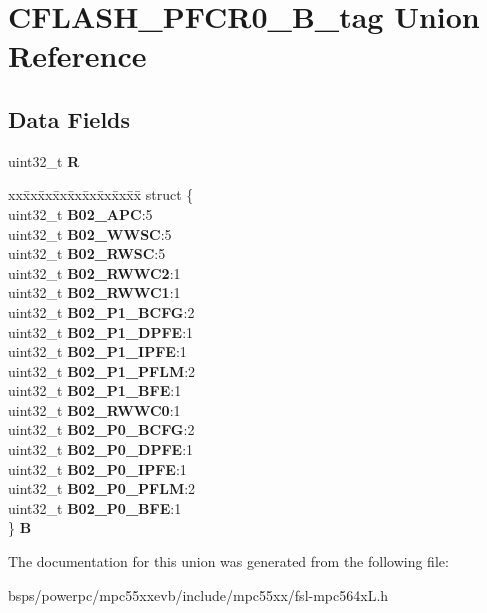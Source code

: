 \hypertarget{unionCFLASH__PFCR0__32B__tag}{}\section{C\+F\+L\+A\+S\+H\+\_\+\+P\+F\+C\+R0\+\_\+B\+\_\+tag Union Reference}
\label{unionCFLASH__PFCR0__32B__tag}
\subsection*{Data Fields}
\begin{DoxyCompactItemize}
\item 
\mbox{\label{unionCFLASH__PFCR0__32B__tag_a981f179d40aac5fec481add4c997f063}} 
uint32\+\_\+t {\bfseries R}
\item 
\mbox{\label{unionCFLASH__PFCR0__32B__tag_a628ac22b7cdafe3cbb6d80d0513fee61}} 
\begin{tabbing}
xx\=xx\=xx\=xx\=xx\=xx\=xx\=xx\=xx\=\kill
struct \{\\
\>uint32\_t {\bfseries B02\_APC}:5\\
\>uint32\_t {\bfseries B02\_WWSC}:5\\
\>uint32\_t {\bfseries B02\_RWSC}:5\\
\>uint32\_t {\bfseries B02\_RWWC2}:1\\
\>uint32\_t {\bfseries B02\_RWWC1}:1\\
\>uint32\_t {\bfseries B02\_P1\_BCFG}:2\\
\>uint32\_t {\bfseries B02\_P1\_DPFE}:1\\
\>uint32\_t {\bfseries B02\_P1\_IPFE}:1\\
\>uint32\_t {\bfseries B02\_P1\_PFLM}:2\\
\>uint32\_t {\bfseries B02\_P1\_BFE}:1\\
\>uint32\_t {\bfseries B02\_RWWC0}:1\\
\>uint32\_t {\bfseries B02\_P0\_BCFG}:2\\
\>uint32\_t {\bfseries B02\_P0\_DPFE}:1\\
\>uint32\_t {\bfseries B02\_P0\_IPFE}:1\\
\>uint32\_t {\bfseries B02\_P0\_PFLM}:2\\
\>uint32\_t {\bfseries B02\_P0\_BFE}:1\\
\} {\bfseries B}\\

\end{tabbing}\end{DoxyCompactItemize}


The documentation for this union was generated from the following file\+:\begin{DoxyCompactItemize}
\item 
bsps/powerpc/mpc55xxevb/include/mpc55xx/fsl-\/mpc564x\+L.\+h\end{DoxyCompactItemize}

